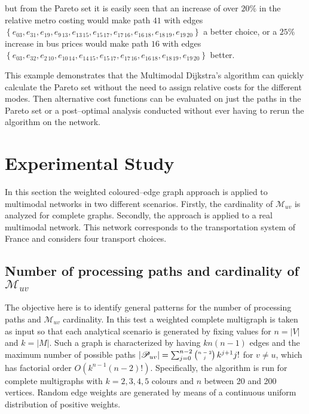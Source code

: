 \documentclass[preprint,authoryear,12pt]{elsarticle}
\begin{document}
but from the Pareto set it is easily seen that an
increase of over $20\%$ in the relative metro costing would make
path $41$ with edges $\left\{e_{03},e_{31},e_{19},e_{9\,13},e_{13\,15},e_{15\,17},
e_{17\,16},e_{16\,18},e_{18\,19},e_{19\,20}\right\}$ a better choice, or
a $25\%$ increase in bus prices would make
path $16$ with edges $\left\{e_{03},e_{32},e_{2\,10},e_{10\,14},e_{14\,15},
e_{15\,17},e_{17\,16},e_{16\,18},e_{18\,19},e_{19\,20}\right\}$ better.

This example demonstrates that the Multimodal Dijkstra's algorithm
can quickly calculate the Pareto set without the need to assign relative
costs for the different modes. Then alternative cost functions can
be evaluated on just the paths in the Pareto set or a post--optimal
analysis conducted without ever having to rerun the algorithm on the network.


\section{Experimental Study}\label{Se:ExperimentalStudy}

In this section the weighted coloured--edge graph approach is applied to
multimodal networks in two different scenarios.
Firstly, the cardinality of $\mathcal{M}_{uv}$ is analyzed for
complete graphs. Secondly, the approach is applied to a real multimodal
network. This network corresponds to the transportation system of France
and considers four transport choices.

\subsection{Number of processing paths and cardinality of $\mathcal{M}_{uv}$}

The objective here is to identify general patterns for the number
of processing paths and $\mathcal{M}_{uv}$ cardinality.
In this test a weighted complete multigraph is taken as
input so that each analytical scenario is generated by fixing
values for $n=|V|$ and $k=|M|$. Such a graph is characterized by
having $kn(n-1)$ edges and the maximum number of possible paths
$|\mathscr{P}_{uv}| = \tiny{\sum_{j=0}^{n-2}\bin{n-2}{j}k^{j+1}j!}$
for $v\neq u$, which has factorial order $O\left(k^{n-1}(n-2)!\right)$.
Specifically, the algorithm is run for complete multigraphs with
$k=2,3,4,5$ colours and $n$ between 20 and 200 vertices.
Random edge weights are generated by means of a continuous uniform
distribution of positive weights.
\end{document}
